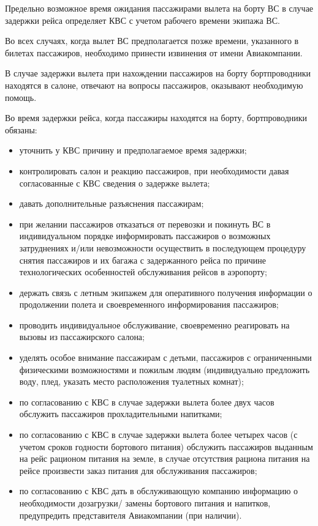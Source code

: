 Предельно возможное время ожидания пассажирами вылета на борту ВС в случае задержки рейса определяет КВС с учетом рабочего времени экипажа ВС.

Во всех случаях, когда вылет ВС предполагается позже времени, указанного в билетах пассажиров, необходимо принести извинения от имени Авиакомпании.

В случае задержки вылета при нахождении пассажиров на борту бортпроводники находятся в салоне, отвечают на вопросы пассажиров, оказывают необходимую помощь.

Во время задержки рейса, когда пассажиры находятся на борту, бортпроводники обязаны:
\begin{itemize}
    \item уточнить у КВС причину и предполагаемое время задержки;
    \item контролировать салон и реакцию пассажиров, при необходимости давая согласованные с КВС сведения о задержке вылета;
    \item давать дополнительные разъяснения пассажирам;
    \item при желании пассажиров отказаться от перевозки и покинуть ВС в индивидуальном порядке информировать пассажиров о возможных затруднениях и/или невозможности осуществить в последующем процедуру снятия пассажиров и их багажа с задержанного рейса по причине технологических особенностей обслуживания рейсов в аэропорту;
    \item держать связь с летным экипажем для оперативного получения информации о продолжении полета и своевременного информирования пассажиров;
    \item проводить индивидуальное обслуживание, своевременно реагировать на вызовы из пассажирского салона;
    \item уделять особое внимание пассажирам с детьми, пассажиров с ограниченными физическими возможностями и пожилым людям (индивидуально предложить воду, плед, указать место расположения туалетных комнат);
    \item по согласованию с КВС в случае задержки вылета более двух часов обслужить пассажиров прохладительными напитками;
    \item по согласованию с КВС в случае задержки вылета более четырех часов (с учетом сроков годности бортового питания) обслужить пассажиров выданным на рейс рационом питания на земле, в случае отсутствия рациона питания на рейсе произвести заказ питания для обслуживания пассажиров;
    \item по согласованию с КВС дать в обслуживающую компанию информацию о необходимости дозагрузки/ замены бортового питания и напитков, предупредить представителя Авиакомпании (при наличии).
\end{itemize}

